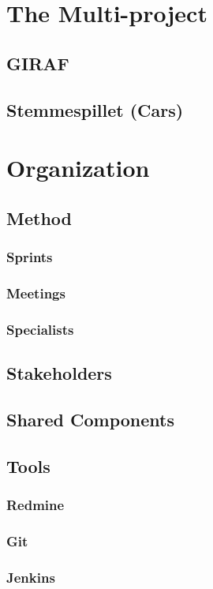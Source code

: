 
\section{The Multi-project}

\subsection{GIRAF}

\subsection{Stemmespillet (Cars)}

\section{Organization}

\subsection{Method}

\subsubsection{Sprints}

\subsubsection{Meetings}

\subsubsection{Specialists}

\subsection{Stakeholders}

\subsection{Shared Components}

\subsection{Tools}

\subsubsection{Redmine}

\subsubsection{Git}

\subsubsection{Jenkins}